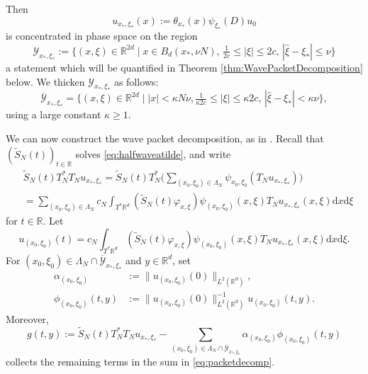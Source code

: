 \documentclass{amsart}
\numberwithin{equation}{section}
\theoremstyle{definition}
\newcommand{\R}{\mathbb{R}}
\newcommand{\Rd}{\mathbb{R}^{d}}
\newcommand {\ud}{\mathrm{d}}
\newcommand {\ka}{\kappa}
\newcommand {\ph}{\varphi}
\newcommand {\Tp}{T^{*}\Rd}
\begin{document}
Then 
\[
u_{x_*,\xi_*}(x):= \theta_{x_*}(x) \psi_{\xi_*}(D) u_0
\]
is concentrated in phase space on the region
\begin{equation*}
    \mathcal{Y}_{x_*,\xi_*}:= \{(x,\xi) \in \R^{2d} \mid x \in B_d(x_*,\nu N), \, \tfrac{1}{2c}\leq |\xi| \leq 2c, \, |\hat{\xi}-\xi_*| \leq \nu \}
\end{equation*}
a statement which will be quantified in Theorem \ref{thm:WavePacketDecomposition} below. 
We thicken $\mathcal{Y}_{x_*,\xi_*}$ 
as follows:
\begin{equation*}
\overline{\mathcal{Y}}_{x_*,\xi_*} = \{(x,\xi) \in \R^{2d} \mid |x| < \ka N \nu, \tfrac{1}{\ka2c} \leq |\xi| \leq \ka 2c, \, |\hat{\xi}-\xi_{*}| < \ka\nu \},
\end{equation*}
using a large constant $\ka\geq 1$.

We can now construct the wave packet decomposition, as in \cite{SchippaTataru2025}. 
Recall that $(\tilde{S}_{N}(t))_{t\in\R}$ solves \eqref{eq:halfwaveatilde}, and write
\begin{equation}\label{eq:packetdecomp}
\begin{split}
&\tilde{S}_N(t) T_N^* T_N u_{x_*,\xi_*} = \tilde{S}_N(t) T_N^*\Big( \sum_{(x_0,\xi_0)\in\Lambda_{N}} \psi_{x_0,\xi_0} (T_N u_{x_*,\xi_*})\Big) \\
&= \sum_{(x_0,\xi_0) \in \Lambda_N} c_N \int_{\Tp} (\tilde{S}_N(t) \ph_{x,\xi}) \psi_{(x_0,\xi_0)}(x,\xi) T_N u_{x_*,\xi_*}(x,\xi) \ud x \ud\xi
\end{split}
\end{equation} 
for $t\in\R$. 
Let
\begin{equation*}
    u_{(x_0,\xi_0)}(t) = c_N \int_{\Tp} (\tilde{S}_N(t) \ph_{x,\xi}) \psi_{(x_0,\xi_0)}(x,\xi) T_N u_{x_*,\xi_*}(x,\xi) \ud x \ud\xi.
\end{equation*}
For $(x_{0},\xi_{0})\in \Lambda_{N}\cap \overline{\mathcal{Y}}_{x_*,\xi_*}$ and $y\in\R^{d}$, set
\begin{align*}
\alpha_{(x_{0},\xi_{0})}&:= \| u_{(x_0,\xi_0)}(0) \|_{L^{2}(\Rd)} ,\\%
\phi_{(x_{0},\xi_{0})}(t,y)&:= \| u_{(x_0,\xi_0)}(0) \|_{L^{2}(\Rd)}^{-1}u_{(x_0,\xi_0)}(t,y) .%
\end{align*}
Moreover,
\[
g(t,y):=\tilde{S}_N(t) T_N^* T_N u_{x_*,\xi_*}-\sum_{(x_{0},\xi_{0})\in \Lambda_{N}\cap \overline{\mathcal{Y}}_{x_*,\xi_*}}\alpha_{(x_{0},\xi_{0})}\phi_{(x_{0},\xi_{0})}(t,y)
\]
collects the remaining terms in the sum in \eqref{eq:packetdecomp}.
\end{document}
